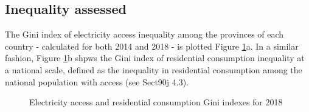 \documentclass[preprint,12pt]{elsarticle}
\begin{document}
\subsection{Inequality assessed}
The Gini index of electricity access inequality among the provinces of each country - calculated for both 2014 and 2018 - is plotted Figure \ref{maps}a.  In a similar fashion, Figure \ref{maps}b shpws the Gini index of residential consumption inequality at a national scale, defined as the inequality in residential consumption among the national population with access (see Sect90j 4.3). 

\begin{figure}[H]
    \centering
    \qquad
    \caption{Electricity access and residential consumption Gini indexes for 2018}
      \label{maps}
\end{figure}
\end{document}
